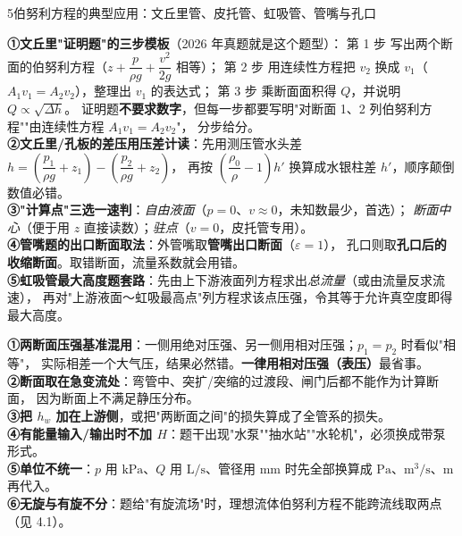 \begin{kaodian}{5}{伯努利方程的典型应用：文丘里管、皮托管、虹吸管、管嘴与孔口}
\begin{banfa}
\textbf{①文丘里"证明题"的三步模板}（2026 年真题就是这个题型）：
第 1 步 写出两个断面的伯努利方程（$z+\dfrac{p}{\rho g}+\dfrac{v^2}{2g}$ 相等）；
第 2 步 用连续性方程把 $v_2$ 换成 $v_1$（$A_1v_1=A_2v_2$），整理出 $v_1$ 的表达式；
第 3 步 乘断面面积得 $Q$，并说明 $Q\propto\sqrt{\Delta h}$。
证明题\textbf{不要求数字}，但每一步都要写明"对断面 1、2 列伯努利方程""由连续性方程 $A_1v_1=A_2v_2$"，
分步给分。\\
\textbf{②文丘里/孔板的差压用压差计读}：先用测压管水头差 $h=\left(\dfrac{p_1}{\rho g}+z_1\right)-\left(\dfrac{p_2}{\rho g}+z_2\right)$，
再按 $\left(\dfrac{\rho_0}{\rho}-1\right)h'$ 换算成水银柱差 $h'$，顺序颠倒数值必错。\\
\textbf{③"计算点"三选一速判}：\emph{自由液面}（$p=0$、$v\approx0$，未知数最少，首选）；
\emph{断面中心}（便于用 $z$ 直接读数）；\emph{驻点}（$v=0$，皮托管专用）。\\
\textbf{④管嘴题的出口断面取法}：外管嘴取\textbf{管嘴出口断面}（$\varepsilon=1$），
孔口则取\textbf{孔口后的收缩断面}。取错断面，流量系数就会用错。\\
\textbf{⑤虹吸管最大高度题套路}：先由上下游液面列方程求出\emph{总流量}（或由流量反求流速），
再对"上游液面～虹吸最高点"列方程求该点压强，令其等于允许真空度即得最大高度。
\end{banfa}

\begin{yicuo}
\textbf{①两断面压强基准混用}：一侧用绝对压强、另一侧用相对压强；$p_1=p_2$ 时看似"相等"，
实际相差一个大气压，结果必然错。\textbf{一律用相对压强（表压）}最省事。\\
\textbf{②断面取在急变流处}：弯管中、突扩/突缩的过渡段、闸门后都不能作为计算断面，
因为断面上不满足静压分布。\\
\textbf{③把 $h_w$ 加在上游侧}，或把"两断面之间"的损失算成了全管系的损失。\\
\textbf{④有能量输入/输出时不加 $H$}：题干出现"水泵""抽水站""水轮机"，必须换成带泵形式。\\
\textbf{⑤单位不统一}：$p$ 用 $\mathrm{kPa}$、$Q$ 用 $\mathrm{L/s}$、管径用 $\mathrm{mm}$ 时先全部换算成
$\mathrm{Pa}$、$\mathrm{m^3/s}$、$\mathrm{m}$ 再代入。\\
\textbf{⑥无旋与有旋不分}：题给"有旋流场"时，理想流体伯努利方程不能跨流线取两点（见 4.1）。
\end{yicuo}
\end{kaodian}

